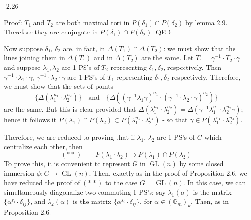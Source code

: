 \begin{center}-2.26-\end{center}
\uline{Proof}: $T_1$ and $T_2$ are both maximal tori in $P(\delta_1)\cap P(\delta_2)$ by lemma 2.9. Therefore they are conjugate in $P(\delta_1)\cap P(\delta_2)$. \uline{QED}

Now suppose $\delta_1$, $\delta_2$ are, in fact, in $\Delta(T_1)\cap\Delta(T_2)$: we must show that the lines joining them in $\Delta(T_1)$ and in $\Delta(T_2)$ are the same. Let $T_1=\gamma^{-1}\cdot T_2\cdot\gamma$ and suppose $\lambda_1,\lambda_2$ are 1-PS's of $T_2$ representing $\delta_1,\delta_2$, respectively. Then $\gamma^{-1}\cdot\lambda_1\cdot\gamma$, $\gamma^{-1}\cdot\lambda_2\cdot\gamma$ are 1-PS's of $T_1$ representing $\delta_1,\delta_2$ respectively. Therefore, we must show that the sets of points
\[
\{\Delta(\lambda_1^{n_1}\cdot\lambda_2^{n_2})\}\quad\text{and}\quad
\{\Delta((\gamma^{-1}\lambda_1\gamma)^{n_1}\cdot(\gamma^{-1}\cdot\lambda_2\cdot\gamma)^{n_2})\}
\]
are the same. But this is clear provided that $\Delta(\lambda_1^{n_1}\cdot\lambda_2^{n_2})=\Delta(\gamma^{-1}\lambda_1^{n_1}\cdot\lambda_2^{n_2}\gamma)$; hence it follows it $P(\lambda_1)\cap P(\lambda_2)\subset P(\lambda_1^{n_1}\cdot\lambda_2^{n_2})$ - so that $\gamma\in P(\lambda_1^{n_1}\cdot\lambda_2^{n_2})$.

Therefore, we are reduced to proving that if $\lambda_1$, $\lambda_2$ are 1-PS's of $G$ which centralize each other, then
\[
(**)\qquad P(\lambda_1\cdot\lambda_2)\supset P(\lambda_1)\cap P(\lambda_2)
\]
To prove this, it is convenient to represent $G$ in $\operatorname{GL}(n)$ by some closed immersion $\phi:G\longrightarrow\operatorname{GL}(n)$. Then, exactly as in the proof of Proposition 2.6, we have reduced the proof of $(**)$ to the case $G=\operatorname{GL}(n)$. In this case, we can simultaneously diagonalize two commuting 1-PS's: say $\lambda_1(\alpha)$ is the matrix $\{\alpha^{r_i}\cdot\delta_{ij}\}$, and $\lambda_2(\alpha)$ is the matrix $\{\alpha^{s_i}\cdot\delta_{ij}\}$, for $\alpha\in(\mathbb G_m)_k$. Then, as in Proposition 2.6,
